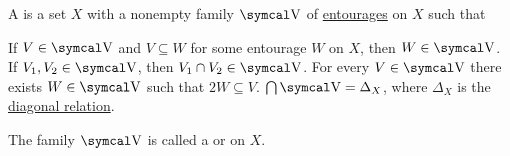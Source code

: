 \begin{definition}\label{def:uniform_space}
  A  is a set \( X \) with a nonempty family \( \CV \) of \hyperref[def:entourage]{entourages} on \( X \) such that
  \begin{DefEnum}
     If \( V \in \CV \) and \( V \subseteq W \) for some entourage \( W \) on \( X \), then \( W \in \CV \).
     If \( V_1, V_2 \in \CV \), then \( V_1 \cap V_2 \in \CV \).
     For every \( V \in \CV \) there exists \( W \in \CV \) such that \( 2W \subseteq V \).
     \( \bigcap \CV = \Delta_X \), where \( \Delta_X \) is the \hyperref[def:binary_relation/diagonal]{diagonal relation}.
  \end{DefEnum}

  The family \( \CV \) is called a  or  on \( X \).
\end{definition}

